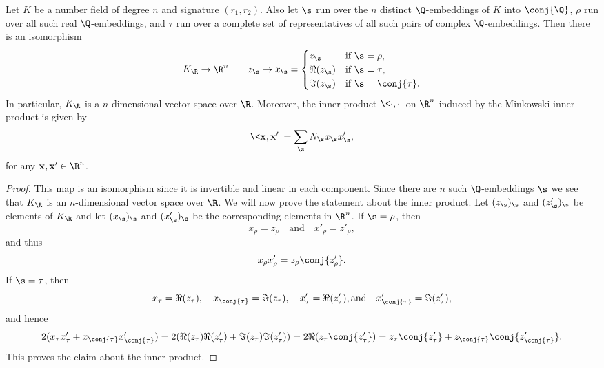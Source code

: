     \begin{proposition}\label{prop:Minkowski_space_isomorphism}
      Let $K$ be a number field of degree $n$ and signature $(r_{1},r_{2})$. Also let $\s$ run over the $n$ distinct $\Q$-embeddings of $K$ into $\conj{\Q}$, $\rho$ run over all such real $\Q$-embeddings, and $\tau$ run over a complete set of representatives of all such pairs of complex $\Q$-embeddings. Then there is an isomorphism
      \[
        K_{\R} \to \R^{n} \qquad z_{\s} \to x_{\s} = \begin{cases} z_{\s} & \text{if $\s = \rho$}, \\ \Re(z_{\s}) & \text{if $\s = \tau$}, \\ \Im(z_{\s}) & \text{if $\s = \conj{\tau}$}. \end{cases}
      \]
      In particular, $K_{\R}$ is a $n$-dimensional vector space over $\R$. Moreover, the inner product $\<\cdot,\cdot\>$ on $\R^{n}$ induced by the Minkowski inner product is given by
      \[
        \<\mathbf{x},\mathbf{x}'\> = \sum_{\s}N_{\s}x_{\s}x'_{\s},
      \]
      for any $\mathbf{x},\mathbf{x}' \in \R^{n}$.
    \end{proposition}
    \begin{proof}
      This map is an isomorphism since it is invertible and linear in each component. Since there are $n$ such $\Q$-embeddings $\s$ we see that $K_{\R}$ is an $n$-dimensional vector space over $\R$. We will now prove the statement about the inner product. Let $(z_{\s})_{\s}$ and $(z'_{\s})_{\s}$ be elements of $K_{\R}$ and let $(x_{\s})_{\s}$ and $(x'_{\s})_{\s}$ be the corresponding elements in $\R^{n}$. If $\s = \rho$, then
      \[
        x_{\rho} = z_{\rho} \quad \text{and} \quad x'_{\rho} = z'_{\rho},
      \]
      and thus
      \[
        x_{\rho}x'_{\rho} = z_{\rho}\conj{z'_{\rho}}.
      \]
      If $\s = \tau$, then
      \[
        x_{\tau} = \Re(z_{\tau}), \quad x_{\conj{\tau}} = \Im(z_{\tau}), \quad x'_{\tau} = \Re(z'_{\tau}), \text{and} \quad x'_{\conj{\tau}} = \Im(z'_{\tau}),
      \]
      and hence
      \[
        2(x_{\tau}x'_{\tau}+x_{\conj{\tau}}x'_{\conj{\tau}}) = 2(\Re(z_{\tau})\Re(z'_{\tau})+\Im(z_{\tau})\Im(z'_{\tau})) = 2\Re(z_{\tau}\conj{z'_{\tau}}) = z_{\tau}\conj{z'_{\tau}}+z_{\conj{\tau}}\conj{z'_{\conj{\tau}}}.
      \]
      This proves the claim about the inner product.
    \end{proof}
    
